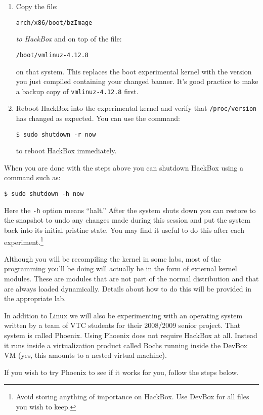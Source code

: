 \documentclass[twocolumn]{article}
\begin{document}
\begin{enumerate}
\item Copy the file:
\begin{Verbatim}
arch/x86/boot/bzImage
\end{Verbatim}
  \emph{to HackBox} and on top of the file:
\begin{Verbatim}
/boot/vmlinuz-4.12.8
\end{Verbatim}
  on that system. This replaces the boot experimental kernel with the version you just compiled
  containing your changed banner. It's good practice to make a backup copy of
  \texttt{vmlinuz-4.12.8} first.

\item Reboot HackBox into the experimental kernel and verify that \texttt{/proc/version} has
  changed as expected. You can use the command:
\begin{Verbatim}
$ sudo shutdown -r now
\end{Verbatim}
  to reboot HackBox immediately.

\end{enumerate}

When you are done with the steps above you can shutdown HackBox using a command such as:
\begin{Verbatim}
$ sudo shutdown -h now
\end{Verbatim}
Here the \texttt{-h} option means ``halt.'' After the system shuts down you can restore to the
snapshot to undo any changes made during this session and put the system back into its initial
pristine state. You may find it useful to do this after each experiment.\footnote{Avoid storing
  anything of importance on HackBox. Use DevBox for all files you wish to keep.}

Although you will be recompiling the kernel in some labs, most of the programming you'll be
doing will actually be in the form of external kernel modules. These are modules that are not
part of the normal distribution and that are always loaded dynamically. Details about how to do
this will be provided in the appropriate lab.

In addition to Linux we will also be experimenting with an operating system written by a team of
VTC students for their 2008/2009 senior project. That system is called Phoenix. Using Phoenix
does not require HackBox at all. Instead it runs inside a virtualization product called Bochs
running inside the DevBox VM (yes, this amounts to a nested virtual machine).

If you wish to try Phoenix to see if it works for you, follow the steps below.
\end{document}
